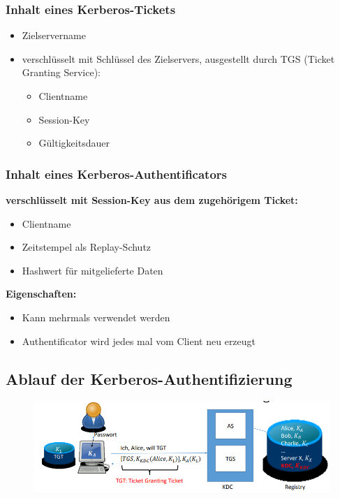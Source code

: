\subsubsection{Inhalt eines Kerberos-Tickets}
\begin{itemize}
	\item Zielservername
	\item verschlüsselt mit Schlüssel des Zielservers, ausgestellt durch TGS (Ticket Granting Service):
	\begin{itemize}
		\item Clientname
		\item Session-Key
		\item Gültigkeitsdauer 
	\end{itemize}
\end{itemize}

\subsubsection{Inhalt eines Kerberos-Authentificators}
\textbf{verschlüsselt mit Session-Key aus dem zugehörigem Ticket:}
\begin{itemize}
	\item Clientname
	\item Zeitstempel als Replay-Schutz
	\item Hashwert für mitgelieferte Daten
\end{itemize}
\textbf{Eigenschaften:}
\begin{itemize}
	\item Kann mehrmals verwendet werden	
	\item Authentificator wird jedes mal vom Client neu erzeugt
\end{itemize}

\subsection{Ablauf der Kerberos-Authentifizierung}
\begin{figure}[H]
	\begin{center}
		\includegraphics[scale=0.8]{Resources/AblaufKerberos1.png}
		\caption{}
		\label{fig:AblaufKerberos1.png}
	\end{center}
\end{figure}

